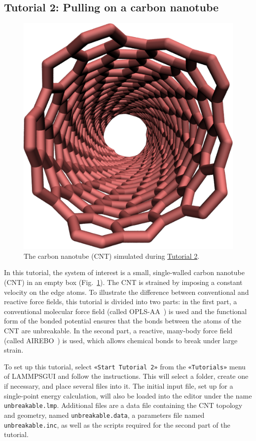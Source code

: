\documentclass[9pt,tutorial]{livecoms}
\newcommand{\flecmd}[1]{\textcolor{command}{\texttt{#1}}} %
\newcommand{\guicmd}[1]{\textcolor{command}{\texttt{«#1»}}} %
\newcommand{\lammpsgui}{\textsf{LAMMPS\textendash GUI}}
\begin{document}
\subsection{Tutorial 2: Pulling on a carbon nanotube}
\label{carbon-nanotube-label}

\begin{figure}
\centering
\includegraphics[width=0.55\linewidth]{CNT}
\caption{The carbon nanotube (CNT) simulated during
\hyperref[carbon-nanotube-label]{Tutorial 2}.}
\label{fig:CNT}
\end{figure}

In this tutorial, the system of interest is a small, single-walled
carbon nanotube (CNT) in an empty box (Fig.~\ref{fig:CNT}).  The CNT is
strained by imposing a constant velocity on the edge atoms.  To
illustrate the difference between conventional and reactive force
fields, this tutorial is divided into two parts: in the first part, a
conventional molecular force field (called
OPLS-AA~\cite{jorgensenDevelopmentTestingOPLS1996}) is used and the
{\color{blue}functional form of the bonded potential ensures that the}
bonds between the atoms of the CNT are unbreakable.  In the second part,
a reactive, {\color{blue} many-body} force field (called
AIREBO~\cite{stuart2000reactive}) is used, which allows chemical bonds
to break under large strain.

To set up this tutorial, select \guicmd{Start Tutorial 2} from the
\guicmd{Tutorials} menu of \lammpsgui{} and follow the instructions.
This will select a folder, create one if necessary, and place several
files into it.  The initial input file, set up for a single-point energy
calculation, will also be loaded into the editor under the name
\flecmd{unbreakable.lmp}.  Additional files are a data file containing
the CNT topology and geometry, named \flecmd{unbreakable.data}, a
parameters file named \flecmd{unbreakable.inc}, as well as the scripts
required for the second part of the tutorial.
\end{document}
